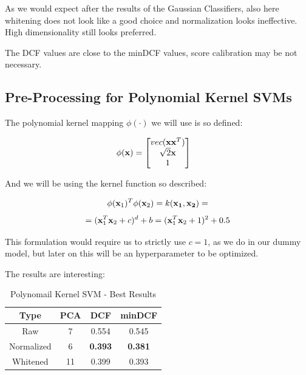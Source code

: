 \documentclass[12pt, twocolumn]{article}
\begin{document}
As we would expect after the results of the Gaussian Classifiers, also here whitening does not look like a good choice and normalization looks ineffective.
High dimensionality still looks preferred.

The DCF values are close to the minDCF values, score calibration may be not necessary.

\subsection{Pre-Processing for Polynomial Kernel SVMs}

The polynomial kernel mapping $\phi(\cdot)$ we will use is so defined:

\begin{center}
    \begin{align}
        \phi({\bf x}) & = \begin{bmatrix}
                            vec({\bf x}{\bf x}^T) \\
                            \sqrt{2}{\bf x} \\
                            1 \\
                      \end{bmatrix}
    \end{align}
\end{center}

And we will be using the kernel function so described:

$$ \phi({\bf x}_1)^T\phi({\bf x}_2) = k({\bf x_1}, {\bf x_2}) = $$
$$ = ({\bf x}_1^T{\bf x}_2 + c)^d + b = ({\bf x}_1^T{\bf x}_2+1)^2+0.5$$

This formulation would require us to strictly use $ c = 1 $, as we do in our dummy model, but later on this will be an hyperparameter to be optimized.

The results are interesting:

\begin{table}[H]
    \centering
        \begin{tabular}{||c|c|c|c||}
            \hline
            Type & PCA & DCF & minDCF \\
            \hline
            \hline
            Raw & 7 & 0.554 &  0.545  \\
            Normalized & 6 & {\bf 0.393} &  {\bf 0.381}  \\
            Whitened & 11 & 0.399 &  0.393  \\
            \hline
    \end{tabular}
    \caption{Polynomail Kernel SVM - Best Results}
\end{table}
\end{document}
